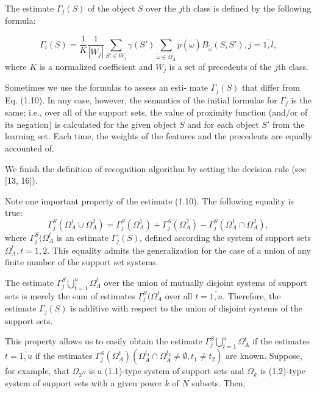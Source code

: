 The estimate $\Gamma_j(S)$ of the object $S$ over the $j$th class 
is defined by the following formula:

\begin{equation}
\Gamma_i(S) = \frac{1}{K}\frac{1}{|W_j|}\sum_{S'\in W_j}\gamma(S')\sum_{\tilde{\omega}\in\Omega_A}p(\tilde{\omega})B_{\tilde{\omega}}(S, S'), j = \bar{1, l},
\end{equation}
where $K$ is a normalized coefficient and $W_j$ is a set of precedents of the $j$th class. 

Sometimes we use the formulas to assess an esti- mate $\Gamma_j(S)$ that differ from 
Eq. (1.10). In any case, however, the semantics of the initial formulas for $\Gamma_j$
is the same; i.e., over all of the support sets, the value of proximity function 
(and/or of its negation) is calculated for the given object $S$ and for each object $S'$ 
from the learning set. Each time, the weights of the features and the precedents 
are equally accounted of.

We finish the definition of recognition algorithm by setting the decision rule (see [13, 16]).

Note one important property of the estimate (1.10). The following equality is true:
\begin{equation*}
\Gamma_j^S(\Omega_A^1 \cup \Omega_A^2) = \Gamma_j^S(\Omega_A^1) + \Gamma_j^S(\Omega_A^2) - \Gamma_j^S(\Omega_A^1 \cap \Omega_A^2), 
\end{equation*}
where $\Gamma_j^S(\Omega_A^t$ is an estimate $\Gamma_j(S)$, defined according the 
system of support sets $\Omega_A^t, t = 1,2$.
This equality admits the generalization for the case of a union of any finite 
number of the support set systems.

The estimate $\Gamma_j^S \bigcup \limits_{t=1}^u \Omega_A^t$
over the union of mutually disjoint systems of support sets is merely the sum of estimates
$\Gamma_j^S(\Omega_A^t$ over all $t = \bar{1,u}$. Therefore, the estimate 
$\Gamma_j(S)$ is additive with respect to 
the union of disjoint systems of the support sets. 

This property allows us to easily obtain the estimate
$\Gamma_j^S \bigcup \limits_{t=1}^u \Omega_A^t$ if the estimates $t = \bar{1,u}$
if the estimates 
$\Gamma_j^S (\Omega_A^t) (\Omega_A^{t_1} \cap  \Omega_A^{t_2} \neq \emptyset, t_1 \neq t_2)$
are known. Suppose, for example, that
$\Omega_{2^N}$ is a (1.1)-type system of support sets and
$\Omega_k$  is (1.2)-type system of support sets with a given power $k$ of $N$ subsets. Then,


